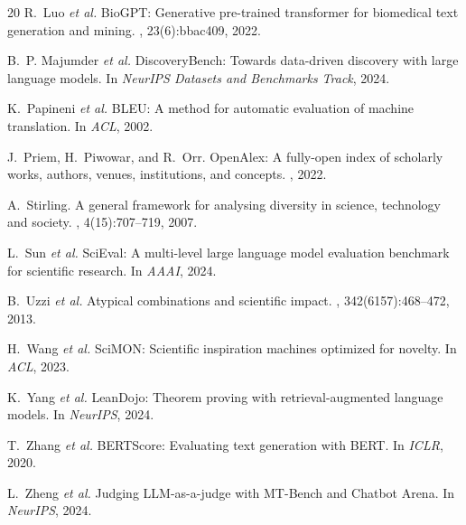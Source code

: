 \documentclass{article}
\newcommand{\etal}{\textit{et al.}}
\begin{document}
\begin{thebibliography}{20}
R.~Luo \etal{}
\newblock BioGPT: Generative pre-trained transformer for biomedical text generation and mining.
, 23(6):bbac409, 2022.

B.~P. Majumder \etal{}
\newblock DiscoveryBench: Towards data-driven discovery with large language models.
\newblock In {\em NeurIPS Datasets and Benchmarks Track}, 2024.

K.~Papineni \etal{}
\newblock BLEU: A method for automatic evaluation of machine translation.
\newblock In {\em ACL}, 2002.

J.~Priem, H.~Piwowar, and R.~Orr.
\newblock OpenAlex: A fully-open index of scholarly works, authors, venues, institutions, and concepts.
, 2022.

A.~Stirling.
\newblock A general framework for analysing diversity in science, technology and society.
, 4(15):707--719, 2007.

L.~Sun \etal{}
\newblock SciEval: A multi-level large language model evaluation benchmark for scientific research.
\newblock In {\em AAAI}, 2024.

B.~Uzzi \etal{}
\newblock Atypical combinations and scientific impact.
, 342(6157):468--472, 2013.

H.~Wang \etal{}
\newblock SciMON: Scientific inspiration machines optimized for novelty.
\newblock In {\em ACL}, 2023.

K.~Yang \etal{}
\newblock LeanDojo: Theorem proving with retrieval-augmented language models.
\newblock In {\em NeurIPS}, 2024.

T.~Zhang \etal{}
\newblock BERTScore: Evaluating text generation with BERT.
\newblock In {\em ICLR}, 2020.

L.~Zheng \etal{}
\newblock Judging LLM-as-a-judge with MT-Bench and Chatbot Arena.
\newblock In {\em NeurIPS}, 2024.

\end{thebibliography}

\newpage
\appendix
\end{document}

